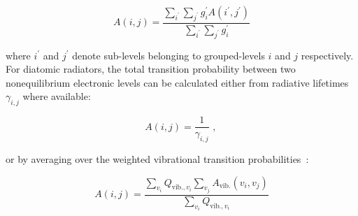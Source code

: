 \begin{equation}
 A(i,j) = \frac{\sum_{i^\prime} \sum_{j^\prime} g_i^\prime A(i^\prime,j^\prime)}{\sum_{i^\prime} \sum_{j^\prime} g_i^\prime} \label{eq:A_av}
\end{equation}

\noindent where $i^\prime$ and $j^\prime$ denote sub-levels belonging to grouped-levels $i$ and $j$ respectively.
For diatomic radiators, the total transition probability between two nonequilibrium electronic levels can be calculated either from radiative lifetimes $\gamma_{i,j}$ where available:

\begin{equation}
 A(i,j) = \frac{1}{\gamma_{i,j}} \text{ , }
\end{equation}

\noindent or by averaging over the weighted vibrational transition probabilities~\cite{hyun_phd}:

\begin{equation}
 A(i,j) = \frac{\sum_{v_i} Q_{\text{vib.},v_i} \sum_{v_j} A_\text{vib.}(v_i,v_j)}{\sum_{v_i} Q_{\text{vib.},v_i}}  \label{eq:A_av_diatomic}
\end{equation}


